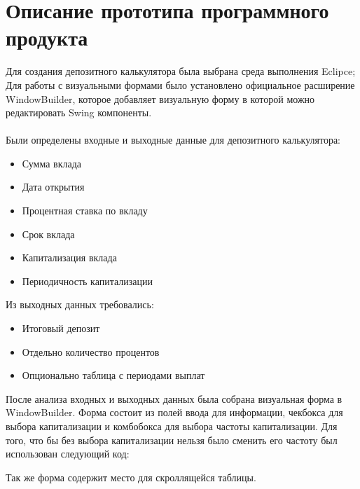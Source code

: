 \newpage
\section{Описание прототипа программного продукта}
Для создания депозитного калькулятора была выбрана среда выполнения Eclipce;
\\Для работы с визуальными формами было установлено официальное расширение
WindowBuilder, которое добавляет визуальную форму в которой можно редактировать
Swing компоненты.\\
\\Были определены входные и выходные данные для депозитного калькулятора:
\begin{itemize}
\item Сумма вклада
\item Дата открытия
\item Процентная ставка по вкладу
\item Срок вклада
\item Капитализация вклада
\item Периодичность капитализации
\end{itemize}
Из выходных данных требовались:
\begin{itemize}
	\item Итоговый депозит
	\item Отдельно количество процентов
	\item Опционально таблица с периодами выплат
\end{itemize}
После анализа входных и выходных данных была собрана визуальная форма в WindowBuilder.
Форма состоит из полей ввода для информации, чекбокса для выбора капитализации
и комбобокса для выбора частоты капитализации. 
Для того, что бы без выбора капитализации нельзя было сменить его частоту был 
использован следующий код:
\newpage

Так же форма содержит место для скроллящейся таблицы.
